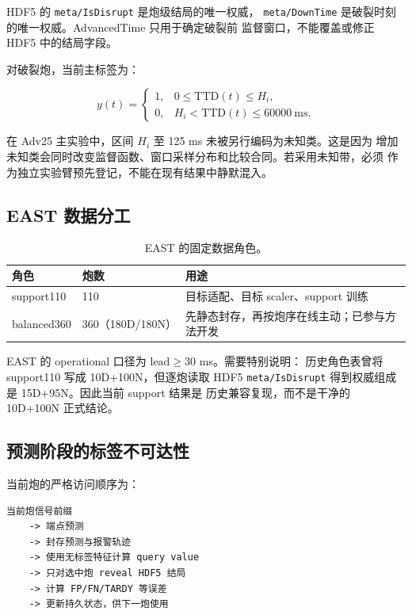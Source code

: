 \documentclass[11pt,a4paper]{article}
\newcommand{\code}[1]{\texttt{\small #1}}
\begin{document}
HDF5 的 \code{meta/IsDisrupt} 是炮级结局的唯一权威，
\code{meta/DownTime} 是破裂时刻的唯一权威。AdvancedTime 只用于确定破裂前
监督窗口，不能覆盖或修正 HDF5 中的结局字段。

对破裂炮，当前主标签为：

\[
y(t)=
\begin{cases}
1,&0\leq \mathrm{TTD}(t)\leq H_i,\\
0,&H_i<\mathrm{TTD}(t)\leq60000\ \mathrm{ms}.
\end{cases}
\]

在 Adv25 主实验中，区间 \(H_i\) 至 125 ms 未被另行编码为未知类。这是因为
增加未知类会同时改变监督函数、窗口采样分布和比较合同。若采用未知带，必须
作为独立实验臂预先登记，不能在现有结果中静默混入。

\subsection{EAST 数据分工}

\begin{table}[H]
\centering
\caption{EAST 的固定数据角色。}
\begin{tabularx}{\textwidth}{l C{25mm} Y}
\toprule
角色 & 炮数 & 用途\\
\midrule
support110 & 110 & 目标适配、目标 scaler、support 训练\\
balanced360 & 360（180D/180N） & 先静态封存，再按炮序在线主动；已参与方法开发\\
\bottomrule
\end{tabularx}
\end{table}

EAST 的 operational 口径为 \(\mathrm{lead}\geq30\) ms。需要特别说明：
历史角色表曾将 support110 写成 10D+100N，但逐炮读取 HDF5
\code{meta/IsDisrupt} 得到权威组成是 15D+95N。因此当前 support 结果是
历史兼容复现，而不是干净的 10D+100N 正式结论。

\subsection{预测阶段的标签不可达性}

当前炮的严格访问顺序为：

\begin{lstlisting}
当前炮信号前缀
    -> 端点预测
    -> 封存预测与报警轨迹
    -> 使用无标签特征计算 query value
    -> 只对选中炮 reveal HDF5 结局
    -> 计算 FP/FN/TARDY 等误差
    -> 更新持久状态，供下一炮使用
\end{lstlisting}
\end{document}
